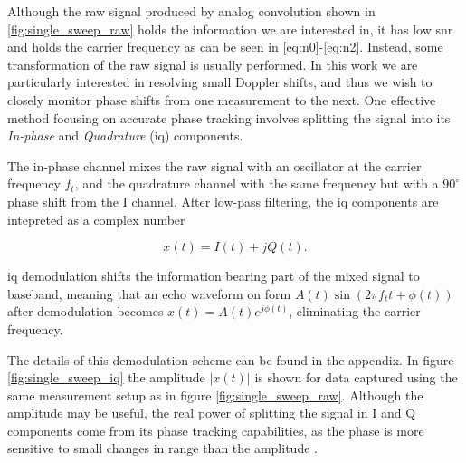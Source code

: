 Although the raw signal produced by analog convolution shown in \ref{fig:single_sweep_raw} holds the information we are interested in, it has low \gls{snr} \citep{richards_2014} and holds the carrier frequency as can be seen in \ref{eq:n0}-\ref{eq:n2}. Instead, some transformation of the raw signal is usually performed. In this work we are particularly interested in resolving small Doppler shifts, and thus we wish to closely monitor phase shifts from one measurement to the next. One effective method focusing on accurate phase tracking involves splitting the signal into its \emph{In-phase} and \emph{Quadrature} (\gls{iq}) components. 

The in-phase channel mixes the raw signal with an oscillator at the carrier frequency $f_t$, and the quadrature channel with the same frequency but with a $90^\circ$ phase shift from the I channel. After low-pass filtering, the \gls{iq} components are intepreted as a complex number

\begin{equation}
	x(t) = I(t) + jQ(t).
\end{equation}

\gls{iq} demodulation shifts the information bearing part of the mixed signal to baseband, meaning that an echo waveform on form $A(t)\sin(2\pi f_t t + \phi(t))$ after demodulation becomes $x(t) = A(t)e^{j\phi(t)}$, eliminating the carrier frequency. 

The details of this demodulation scheme can be found in the appendix. In figure \ref{fig:single_sweep_iq} the amplitude $|x(t)|$ is shown for data captured using the same measurement setup as in figure \ref{fig:single_sweep_raw}. Although the amplitude may be useful, the real power of splitting the signal in I and Q components come from its phase tracking capabilities, as the phase is more sensitive to small changes in range than the amplitude \citep{lien_gillian_karagozler_amihood_schwesig_olson_raja_poupyrev_2016}.





